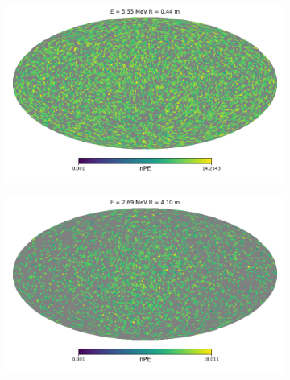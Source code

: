 \documentclass[../main.tex]{subfiles}
\begin{document}
\begin{figure}
  \centering
  \begin{subfigure}[t]{0.48\linewidth}
    \includegraphics[width=\linewidth]{images/jgnn/harmonic/event_idx_0.png}
    \caption{}
  \end{subfigure}
  \hfill
  \begin{subfigure}[t]{0.48\linewidth}
    \includegraphics[width=\linewidth]{images/jgnn/harmonic/event_idx_10.png}
    \caption{}
  \end{subfigure}



\end{figure}
\end{document}
